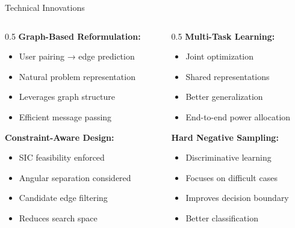 \documentclass[aspectratio=169]{beamer}
\begin{document}
\begin{frame}{Technical Innovations}
    \begin{columns}
        \begin{column}{0.5\textwidth}
            \textbf{Graph-Based Reformulation:}
            \begin{itemize}
                \item User pairing → edge prediction
                \item Natural problem representation
                \item Leverages graph structure
                \item Efficient message passing
            \end{itemize}
            
            \vspace{0.3cm}
            
            \textbf{Constraint-Aware Design:}
            \begin{itemize}
                \item SIC feasibility enforced
                \item Angular separation considered
                \item Candidate edge filtering
                \item Reduces search space
            \end{itemize}
        \end{column}
        \begin{column}{0.5\textwidth}
            \textbf{Multi-Task Learning:}
            \begin{itemize}
                \item Joint optimization
                \item Shared representations
                \item Better generalization
                \item End-to-end power allocation
            \end{itemize}
            
            \vspace{0.3cm}
            
            \textbf{Hard Negative Sampling:}
            \begin{itemize}
                \item Discriminative learning
                \item Focuses on difficult cases
                \item Improves decision boundary
                \item Better classification
            \end{itemize}
        \end{column}
    \end{columns}
    

\end{frame}
\end{document}
